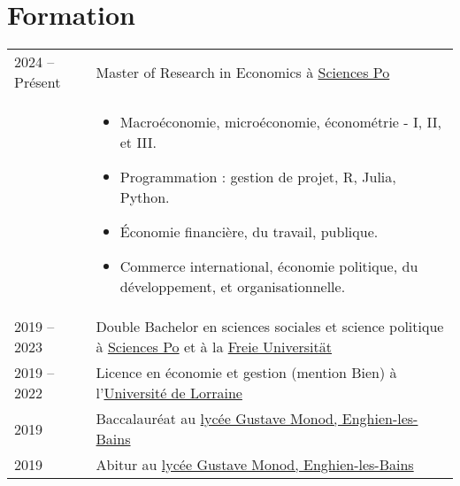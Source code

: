 \documentclass[a4paper,12pt]{article}
\begin{document}
\section{Formation}
\begin{tabularx}{\linewidth}{@{}l X@{}}	

2024 – Présent & Master of Research in Economics à \href{https://www.sciencespo.fr/en/}{Sciences Po} \\ 
& \begin{itemize}
    \item Macroéconomie, microéconomie, économétrie - I, II, et III.
    \item Programmation : gestion de projet, R, Julia, Python.
    \item Économie financière, du travail, publique.
    \item Commerce international, économie politique, du développement, et organisationnelle.
\end{itemize} \\

2019 – 2023 & Double Bachelor en sciences sociales et science politique à \href{https://www.sciencespo.fr/en/}{Sciences Po} et à la \href{https://www.fu-berlin.de/en/index.html}{Freie Universität}\\

2019 – 2022 & Licence en économie et gestion (mention Bien) à l'\href{https://www.univ-lorraine.fr/en/}{Université de Lorraine}\\

2019 & Baccalauréat au \href{https://www.lyc-polyvalent-monod-enghien.fr/}{lycée Gustave Monod, Enghien-les-Bains} \hfill \\

2019 & Abitur au \href{https://www.lyc-polyvalent-monod-enghien.fr/}{lycée Gustave Monod, Enghien-les-Bains} \hfill \\
\end{tabularx}

\end{document}
